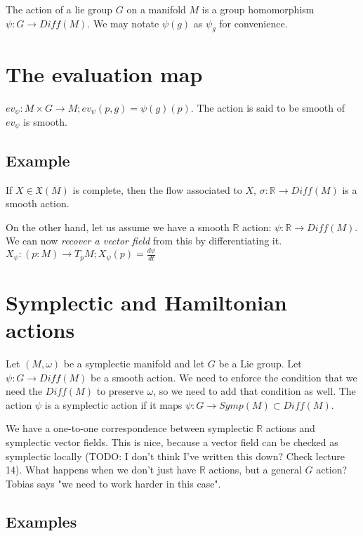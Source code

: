 \documentclass[11pt]{book}
\newcommand{\R}{\ensuremath{\mathbb R}}
\newcommand{\vectorfield}{\ensuremath{\mathfrak{X}}}
\begin{document}
The action of a lie group $G$ on a manifold $M$ is a group
homomorphism $\psi : G \rightarrow Diff(M)$. We may notate
$\psi(g)$ as $\psi_g$ for convenience.

\section{The evaluation map}
$ev_\psi: M \times G \rightarrow M; ev_\psi(p, g) = \psi(g)(p)$.
The action is said to be smooth of $ev_\psi$ is smooth.

\subsection{Example}
If $X \in \vectorfield(M)$ is complete, then the flow associated to $X$,
$\sigma: \R \rightarrow Diff(M)$ is a smooth action.

On the other hand, let us assume we have a smooth $\R$ action: $\psi: \R \rightarrow Diff(M)$.
We can now \emph{recover a vector field} from this by differentiating it. 
$X_\psi : (p : M) \rightarrow T_p M; X_\psi(p) = \frac{d\psi}{dt}$

\section{Symplectic and Hamiltonian actions}

Let $(M, \omega)$ be a symplectic manifold and let $G$ be a Lie group.
Let $\psi: G \rightarrow Diff(M)$ be a smooth action. We need to enforce
the condition that we need the $Diff(M)$ to preserve $\omega$, so we need
to add that condition as well. The action $\psi$ is a symplectic action
if it maps $\psi: G \rightarrow Symp(M) \subset Diff(M)$.

We have a one-to-one correspondence between symplectic $\R$ actions and symplectic
vector fields. This is nice, because a vector field can be checked as symplectic
locally (TODO: I don't think I've written this down? Check lecture 14). What
happens when we don't just have $\R$ actions, but a general $G$ action? Tobias
says "we need to work harder in this case".

\subsection{Examples}
\end{document}
